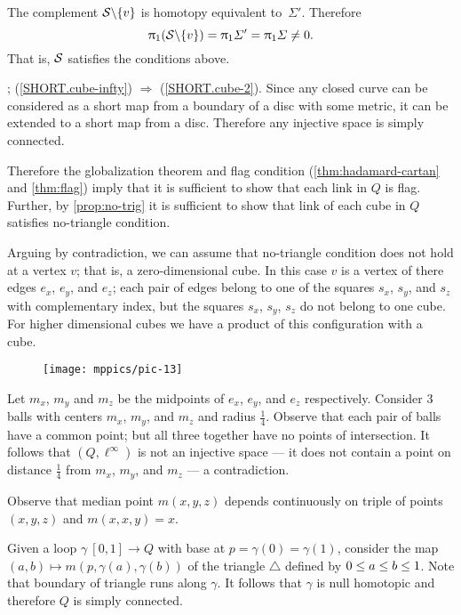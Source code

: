 The complement $\mathcal{S}\backslash\{v\}$ is homotopy equivalent to~$\Sigma'$.
Therefore 
\[
\uppi_1(\mathcal{S}\backslash\{v\})
=\uppi_1\varSigma'
=\uppi_1\varSigma\ne 0.
\]
That is, $\mathcal{S}$ satisfies the conditions above.
\qeds

; (\ref{SHORT.cube-infty}) $\Rightarrow$ (\ref{SHORT.cube-2}).
Since any closed curve can be considered as a short map from a boundary of a disc with some metric, it can be extended to a short map from a disc.
Therefore any injective space is simply connected.

Therefore the globalization theorem and flag condition (\ref{thm:hadamard-cartan} and \ref{thm:flag}) imply that it is sufficient to show that each link in $Q$ is flag.
Further, by \ref{prop:no-trig} it is sufficient to show that link of each cube in $Q$ satisfies no-triangle condition.

Arguing by contradiction, we can assume that no-triangle condition does not hold at a vertex $v$; that is, a zero-dimensional cube.
In this case $v$ is a vertex of there edges $e_x$, $e_y$, and $e_z$;
each pair of edges belong to one of the squares $s_x$, $s_y$, and $s_z$ with complementary index, but the squares $s_x$, $s_y$, $s_z$ do not belong to one cube.
For higher dimensional cubes we have a product of this configuration with a cube.

\begin{wrapfigure}{r}{25 mm}
\vskip-4mm
\centering
\texttt{[image: mppics/pic-13]}
\end{wrapfigure}

Let $m_x$, $m_y$ and $m_z$ be the midpoints of $e_x$, $e_y$, and $e_z$ respectively.
Consider 3 balls with centers $m_x$, $m_y$, and $m_z$ and radius $\tfrac14$.
Observe that each pair of balls have a common point;
but all three together have no points of intersection.
It follows that $(Q,\ell^\infty)$ is not an injective space --- it does not contain a point on distance $\tfrac14$ from $m_x$, $m_y$, and $m_z$ --- a contradiction.


Observe that median point $m(x,y,z)$ depends continuously on triple of points $(x,y,z)$ and $m(x,x,y)=x$.

Given a loop $\gamma\:[0,1]\to Q$ with base at $p=\gamma(0)=\gamma(1)$,
consider the map $(a,b)\mapsto m(p,\gamma(a),\gamma(b))$ of the triangle $\triangle$ defined by $0\z\le a \z\le b\z\le 1$.
Note that boundary of triangle runs along $\gamma$.
It follows that $\gamma$ is null homotopic and therefore $Q$ is simply connected.

